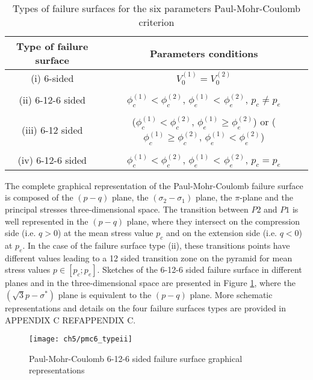 \begin{table}
    \centering 
    \begin{tabular}{cc}
        \hline 
        Type of failure surface & Parameters conditions   \\
        \hline
        \hline
        (i) 6-sided & $V_0^{(1)} = V_0^{(2)}$ \\
        \\
        (ii) 6-12-6 sided & $\phi_{c}^{(1)} < \phi_{c}^{(2)}$, $\phi_{e}^{(1)}$ < $\phi_{e}^{(2)}$, $p_c \neq p_e$\\ 
        \\
        (iii) 6-12 sided & ($\phi_{c}^{(1)} < \phi_{c}^{(2)}$, $\phi_{e}^{(1)} \geq \phi_{e}^{(2)}$) or ($\phi_{c}^{(1)} \geq \phi_{c}^{(2)}$, $\phi_{e}^{(1)} < \phi_{e}^{(2)}$)\\
        \\
        (iv) 6-12-6 sided & $\phi_{c}^{(1)} < \phi_{c}^{(2)}$, $\phi_{e}^{(1)}$ < $\phi_{e}^{(2)}$, $p_c = p_e$\\ 
        \hline
    \end{tabular}
    \captionsetup{justification=centering}
    \caption{Types of failure surfaces for the six parameters Paul-Mohr-Coulomb criterion}
    \label{tb5:pmc6p_pyramids}
\end{table}

The complete graphical representation of the Paul-Mohr-Coulomb failure surface is composed of the $(p-q)$ plane, the $(\sigma_2-\sigma_1)$ plane, the $\pi$-plane and the principal stresses three-dimensional space. The transition between $P2$ and $P1$ is well represented in the $(p-q)$ plane, where they intersect on the compression side (i.e. $q > 0$) at the mean stress value $p_c$ and on the extension side (i.e. $q < 0$) at $p_e$. In the case of the failure surface type (ii), these transitions points have different values leading to a 12 sided transition zone on the pyramid for mean stress values $p \in \left[p_c;p_e\right]$. Sketches of the 6-12-6 sided failure surface in different planes and in the three-dimensional space are presented in Figure \ref{fig5:6pmc_typeii}, where the $(\sqrt{3}p-\sigma^*)$ plane is equivalent to the $(p-q)$ plane. More schematic representations and details on the four failure surfaces types are provided in APPENDIX C REF{APPENDIX C}.

\begin{figure}
    \centering
    \texttt{[image: ch5/pmc6\_typeii]}
    \caption{Paul-Mohr-Coulomb 6-12-6 sided failure surface graphical representations}
    \label{fig5:6pmc_typeii}
\end{figure}

